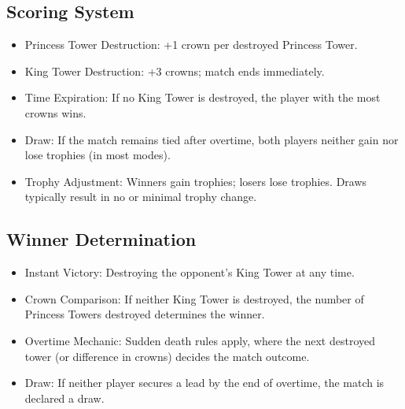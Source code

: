 \documentclass{article}
\begin{document}
\subsection{Scoring System}
\begin{itemize}
    \item Princess Tower Destruction: +1 crown per destroyed Princess Tower.
    \item King Tower Destruction: +3 crowns; match ends immediately.
    \item Time Expiration: If no King Tower is destroyed, the player with the most crowns wins.
    \item Draw: If the match remains tied after overtime, both players neither gain nor lose trophies (in most modes).
    \item Trophy Adjustment: Winners gain trophies; losers lose trophies. Draws typically result in no or minimal trophy change.
\end{itemize}

\subsection{Winner Determination}
\begin{itemize}
    \item Instant Victory: Destroying the opponent’s King Tower at any time.
    \item Crown Comparison: If neither King Tower is destroyed, the number of Princess Towers destroyed determines the winner.
    \item Overtime Mechanic: Sudden death rules apply, where the next destroyed tower (or difference in crowns) decides the match outcome.
    \item Draw: If neither player secures a lead by the end of overtime, the match is declared a draw.
\end{itemize}
\end{document}
